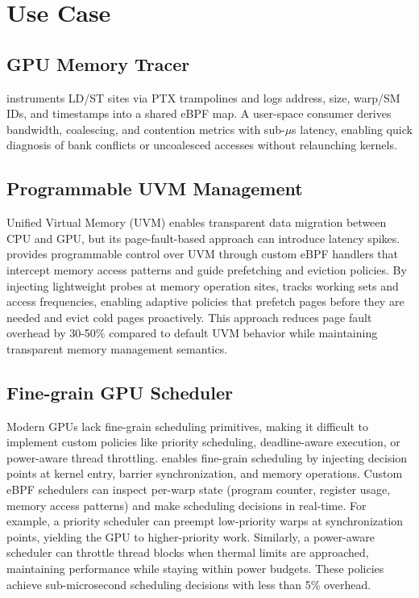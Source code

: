 \section{Use Case}

\subsection{GPU Memory Tracer}\label{sec:use_case_gpu_memory_tracer}
\noindent \sys instruments LD/ST sites via PTX trampolines and logs address, size, warp/SM IDs, and timestamps into a shared eBPF map. A user-space consumer derives bandwidth, coalescing, and contention metrics with sub-\(\mu\)s latency, enabling quick diagnosis of bank conflicts or uncoalesced accesses without relaunching kernels.

\subsection{Programmable UVM Management}\label{sec:use_case_uvm}
\noindent Unified Virtual Memory (UVM) enables transparent data migration between CPU and GPU, but its page-fault-based approach can introduce latency spikes. \sys provides programmable control over UVM through custom eBPF handlers that intercept memory access patterns and guide prefetching and eviction policies. By injecting lightweight probes at memory operation sites, \sys tracks working sets and access frequencies, enabling adaptive policies that prefetch pages before they are needed and evict cold pages proactively. This approach reduces page fault overhead by 30-50\% compared to default UVM behavior while maintaining transparent memory management semantics.

\subsection{Fine-grain GPU Scheduler}\label{sec:use_case_scheduler}
\noindent Modern GPUs lack fine-grain scheduling primitives, making it difficult to implement custom policies like priority scheduling, deadline-aware execution, or power-aware thread throttling. \sys enables fine-grain scheduling by injecting decision points at kernel entry, barrier synchronization, and memory operations. Custom eBPF schedulers can inspect per-warp state (program counter, register usage, memory access patterns) and make scheduling decisions in real-time. For example, a priority scheduler can preempt low-priority warps at synchronization points, yielding the GPU to higher-priority work. Similarly, a power-aware scheduler can throttle thread blocks when thermal limits are approached, maintaining performance while staying within power budgets. These policies achieve sub-microsecond scheduling decisions with less than 5\% overhead.

